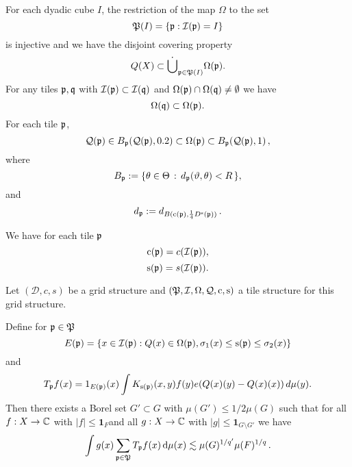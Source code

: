 For each dyadic cube $I$, the restriction of the  map $\Omega$ to the set
\begin{equation}\label{injective}
    \mathfrak P(I)=\{\mathfrak p: \mathcal{I}(\mathfrak p) =I\}
\end{equation}
is injective
and we have the disjoint covering property
\begin{equation}\label{eq dis freq cover}
{Q}(X)\subset \dot{\bigcup}_{\mathfrak p\in \mathfrak P(I)}\Omega(\mathfrak p).
\end{equation}
For any tiles $\mathfrak p,\mathfrak q$ with $\mathcal{I}(\mathfrak p)\subset \mathcal{I}(\mathfrak q)$ and $\Omega(\mathfrak p) \cap \Omega(\mathfrak q) \neq  \emptyset$ we have
\begin{equation} \label{eq freq dyadic}
\Omega(\mathfrak q)\subset \Omega(\mathfrak p) .
\end{equation}
For each tile $\mathfrak p$,
        \begin{equation}\label{eq freq comp ball}
        \mathcal{Q}(\mathfrak p)\in B_{\mathfrak p}(\mathcal{Q}(\mathfrak p), 0.2) \subset \Omega(\mathfrak p) \subset B_{\mathfrak p}(\mathcal{Q}(\mathfrak p),1)\,,
        \end{equation}
        where
\begin{equation}
    B_{\mathfrak p} := \{\theta \in \Theta \, : \, d_{\mathfrak p}(\vartheta, \theta) < R\,\} ,
\end{equation}
    and
\begin{equation}\label{defdp}
d_{\mathfrak p} := d_{B(\mathrm{c}(\mathfrak p),\frac 14 D^{\mathrm{s}}(\mathfrak p))}\, .
\end{equation}




We have for each tile $\mathfrak p$
\begin{equation}\label{tilecenter}
    \mathrm{c}(\mathfrak p)=c(\mathcal{I}(\mathfrak p)),
\end{equation}
\begin{equation}\label{tilescale}
    \mathrm{s}(\mathfrak p)=s(\mathcal{I}(\mathfrak p)).
\end{equation}


\begin{prop}
\label{prop dyadic}
Let $(\mathcal{D}, c, s)$ be a grid structure and $(\mathfrak P,\mathcal{I},\Omega,\mathcal{Q},\mathrm{c},\mathrm{s})$
a tile structure  for this grid structure.

Define for $\mathfrak p\in \mathfrak P$
\begin{equation}\label{defineep}
    E(\mathfrak p)=\{x\in \mathcal{I}(\mathfrak p): {Q}(x)\in \Omega(\mathfrak p) , {\sigma_1}(x)\le \mathrm{s}(\mathfrak p)\le {\sigma_2}(x)\}
\end{equation}
and
\begin{equation}\label{definetp}
    T_{\mathfrak p} f(x)= 1_{E(\mathfrak p)}(x) \int   K_{\mathrm{s}(\mathfrak p)}(x,y) f(y) e({Q}(x)(y)-{Q}(x)(x))\, d\mu(y).
\end{equation}
Then there exists a Borel set $G'\subset G$ with $\mu(G') \leq 1/2\mu(G)$ such that for all $f:X\to \mathbb{C}$ with $|f|\le \mathbf{1}_F$and all
$g:X\to \mathbb{C}$ with $|g|\le \mathbf{1}_{G\setminus G'}$
we have
\begin{equation}
    \label{disclesssim}
    \int g(x) \sum_{\mathfrak p \in \mathfrak P} T_{\mathfrak p} f (x) \, \mathrm{d}\mu(x)  \lesssim \mu(G)^{1/q'} \mu(F)^{1/q}\,.
\end{equation}
\end{prop}

